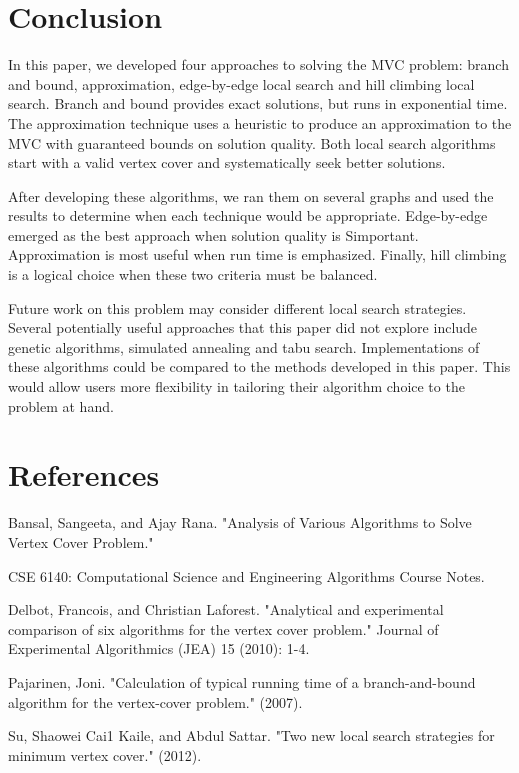 \documentclass{sig-alternate-05-2015}
\begin{document}
\section{Conclusion}
In this paper, we developed four approaches to solving the MVC problem: branch and bound, approximation, edge-by-edge local search and hill climbing local search. Branch and bound provides exact solutions, but runs in exponential time. The approximation technique uses a heuristic to produce an approximation to the MVC with guaranteed bounds on solution quality. Both local search algorithms start with a valid vertex cover and systematically seek better solutions.
\par 
After developing these algorithms, we ran them on several graphs and used the results to determine when each technique would be appropriate. Edge-by-edge emerged as the best approach when solution quality is Simportant. Approximation is most useful when run time is emphasized. Finally, hill climbing is a logical choice when these two criteria must be balanced.
\par 
Future work on this problem may consider different local search strategies. Several potentially useful approaches that this paper did not explore include genetic algorithms, simulated annealing and tabu search. Implementations of these algorithms could be compared to the methods developed in this paper. This would allow users more flexibility in tailoring their algorithm choice to the problem at hand.           


\section{References}
Bansal, Sangeeta, and Ajay Rana. "Analysis of Various Algorithms to Solve Vertex Cover Problem."
\par
CSE 6140: Computational Science and Engineering Algorithms Course Notes.
\par
Delbot, Francois, and Christian Laforest. "Analytical and experimental comparison of six algorithms for the vertex cover problem." Journal of Experimental Algorithmics (JEA) 15 (2010): 1-4.
\par
Pajarinen, Joni. "Calculation of typical running time of a branch-and-bound algorithm for the vertex-cover problem." (2007).
\par
Su, Shaowei Cai1 Kaile, and Abdul Sattar. "Two new local search strategies for minimum vertex cover." (2012).

\clearpage
\end{document}
